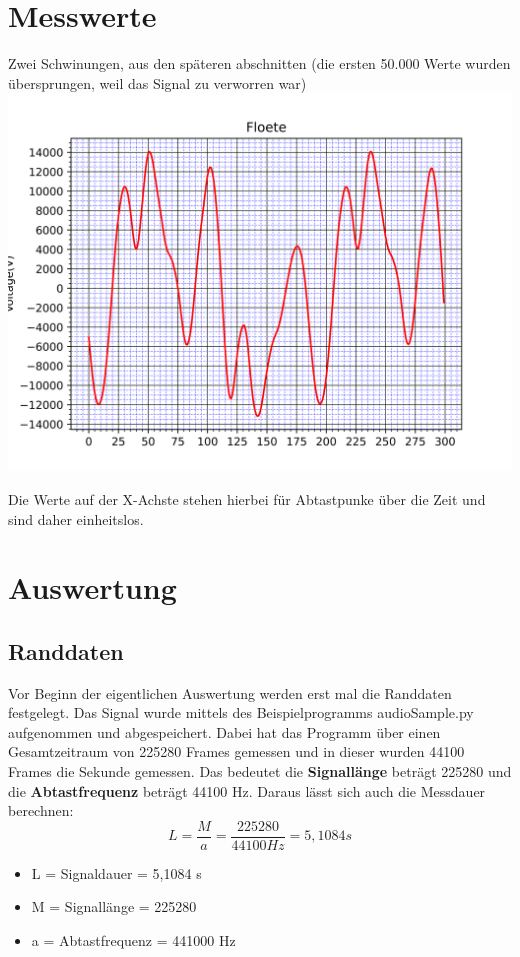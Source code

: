 \section{Messwerte}
\label{chap:VERSUCH_1_MESSWERTE}

Zwei Schwinungen, aus den späteren abschnitten (die ersten 50.000 Werte wurden übersprungen, weil das Signal zu verworren war)
\includegraphics[scale=0.05]{media/Signal_Raster.png}

Die Werte auf der X-Achste stehen hierbei für Abtastpunke über die Zeit und sind daher einheitslos.

\section{Auswertung}
\label{chap:VERSUCH_1_AUSWERTUNG}

\subsection*{Randdaten}

Vor Beginn der eigentlichen Auswertung werden erst  mal die Randdaten festgelegt. Das Signal wurde mittels des Beispielprogramms audioSample.py aufgenommen und abgespeichert. Dabei hat das Programm über einen Gesamtzeitraum von 225280 Frames gemessen und in dieser wurden 44100 Frames die Sekunde gemessen.
Das bedeutet die \textbf{Signallänge} beträgt 225280 und die \textbf{Abtastfrequenz} beträgt 44100 Hz.
Daraus lässt sich auch die Messdauer berechnen:
\begin{equation}
	L = \frac{M}{a} = \frac{225280}{44100 Hz} = 5,1084 s
\end{equation}
\begin{itemize}
	\item L = Signaldauer = 5,1084 s
	\item M = Signallänge = 225280
	\item a = Abtastfrequenz = 441000 Hz 
\end{itemize}

